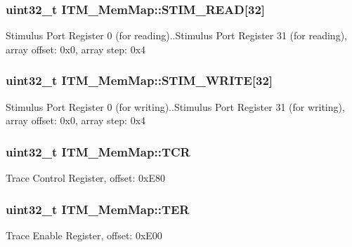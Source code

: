 \subsubsection[{S\+T\+I\+M\+\_\+\+R\+E\+A\+D}]{\setlength{\rightskip}{0pt plus 5cm}uint32\+\_\+t I\+T\+M\+\_\+\+Mem\+Map\+::\+S\+T\+I\+M\+\_\+\+R\+E\+A\+D\mbox{[}32\mbox{]}}\label{struct_i_t_m___mem_map_afb3f200b95047ddd2dc4b045887ebfa3}
Stimulus Port Register 0 (for reading)..Stimulus Port Register 31 (for reading), array offset\+: 0x0, array step\+: 0x4 \hypertarget{struct_i_t_m___mem_map_a0ba1ca981edcde8bf08accc593fa1f52}{}
\subsubsection[{S\+T\+I\+M\+\_\+\+W\+R\+I\+T\+E}]{\setlength{\rightskip}{0pt plus 5cm}uint32\+\_\+t I\+T\+M\+\_\+\+Mem\+Map\+::\+S\+T\+I\+M\+\_\+\+W\+R\+I\+T\+E\mbox{[}32\mbox{]}}\label{struct_i_t_m___mem_map_a0ba1ca981edcde8bf08accc593fa1f52}
Stimulus Port Register 0 (for writing)..Stimulus Port Register 31 (for writing), array offset\+: 0x0, array step\+: 0x4 \hypertarget{struct_i_t_m___mem_map_a9dceb31807fae649d751a78f490383d8}{}
\subsubsection[{T\+C\+R}]{\setlength{\rightskip}{0pt plus 5cm}uint32\+\_\+t I\+T\+M\+\_\+\+Mem\+Map\+::\+T\+C\+R}\label{struct_i_t_m___mem_map_a9dceb31807fae649d751a78f490383d8}
Trace Control Register, offset\+: 0x\+E80 \hypertarget{struct_i_t_m___mem_map_a661efbaf7200441e036619587dabaeb0}{}
\subsubsection[{T\+E\+R}]{\setlength{\rightskip}{0pt plus 5cm}uint32\+\_\+t I\+T\+M\+\_\+\+Mem\+Map\+::\+T\+E\+R}\label{struct_i_t_m___mem_map_a661efbaf7200441e036619587dabaeb0}
Trace Enable Register, offset\+: 0x\+E00 \hypertarget{struct_i_t_m___mem_map_a24ac79f5d070330282c6c0feae3cbcc1}{}

